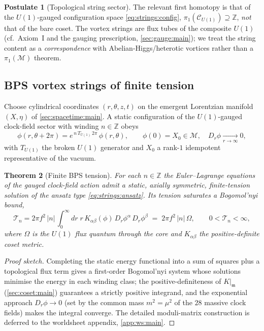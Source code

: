 \documentclass[11pt]{article}
\theoremstyle{plain}
\newtheorem{theorem}{Theorem}[section]
\theoremstyle{definition}
\newtheorem{postulate}[theorem]{Postulate}
\theoremstyle{remark}
\begin{document}
\begin{postulate}[Topological string sector]
\label{post:strings:sector}
The relevant first homotopy is that of the $U(1)$-gauged configuration
space \eqref{eq:strings:config}, $\pi_{1}(\mathcal{C}_{U(1)})\supseteq
\mathbb{Z}$, \emph{not} that of the bare coset. The vortex strings are
flux tubes of the composite $U(1)$ (cf.\ Axiom~I and the gauging
prescription, \autoref{sec:gauge:main}); we treat the string content as a
\emph{correspondence} with Abelian-Higgs/heterotic vortices rather than a
$\pi_{1}(\mathcal{M})$ theorem.
\end{postulate}

\subsection{BPS vortex strings of finite tension}
\label{sec:strings:bps}

Choose cylindrical coordinates $(r,\theta,z,t)$ on the emergent
Lorentzian manifold $(X,\eta)$ of \autoref{sec:spacetime:main}. A static
configuration of the $U(1)$-gauged clock-field sector with winding
$n\in\mathbb{Z}$ obeys
\begin{equation}
  \phi(r,\theta+2\pi)=e^{\,n\,T_{U(1)}\,2\pi}\,\phi(r,\theta),
  \qquad
  \phi(0)=X_{0}\in\mathcal{M},\quad
  D_{r}\phi\xrightarrow[r\to\infty]{}0,
  \label{eq:strings:ansatz}
\end{equation}
with $T_{U(1)}$ the broken $U(1)$ generator and $X_{0}$ a rank-$1$
idempotent representative of the vacuum.

\begin{theorem}[Finite BPS tension]
\label{thm:strings:tension}
For each $n\in\mathbb{Z}$ the Euler--Lagrange equations of the gauged
clock-field action admit a static, axially symmetric, finite-tension
solution of the ansatz type \eqref{eq:strings:ansatz}. Its tension
saturates a Bogomol'nyi bound,
\begin{equation}
  \mathcal{T}_{n}
   = 2\pi f^{2}\,|n|\,
     \int_{0}^{\infty}\!dr\;
     r\,K_{\alpha\beta}(\phi)\,
     D_{r}\phi^{\alpha}\,D_{r}\phi^{\beta}
   \;=\; 2\pi f^{2}\,|n|\,\Omega,
  \qquad 0<\mathcal{T}_{n}<\infty,
  \label{eq:strings:tension}
\end{equation}
where $\Omega$ is the $U(1)$ flux quantum through the core and
$K_{\alpha\beta}$ the positive-definite coset metric.
\end{theorem}

\begin{proof}[Proof sketch]
Completing the static energy functional into a sum of squares plus a
topological flux term gives a first-order Bogomol'nyi system whose
solutions minimise the energy in each winding class; the
positive-definiteness of $K|_{\mathfrak m}$ (\autoref{sec:coset:main})
guarantees a strictly positive integrand, and the exponential approach
$D_{r}\phi\to0$ (set by the common mass $m^{2}=\mu^{2}$ of the $28$
massive clock fields) makes the integral converge. The detailed
moduli-matrix construction is deferred to the worldsheet appendix,
\autoref{app:ws:main}.
\end{proof}
\end{document}
